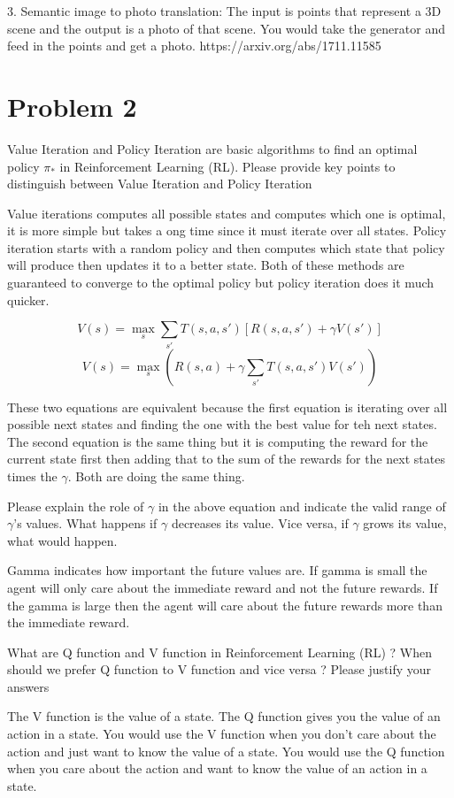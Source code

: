 \documentclass[12pt]{article}
\begin{document}
3. Semantic image to photo translation: The input is points that represent a 3D scene and the output is a photo of that scene. You would take the generator and feed in the points and get a photo. https://arxiv.org/abs/1711.11585

\section*{Problem 2}

Value Iteration and Policy Iteration are basic algorithms to find an optimal policy $\pi_{*}$ in Reinforcement Learning (RL). Please provide key points to distinguish between Value Iteration and Policy Iteration

Value iterations computes all possible states and computes which one is optimal, it is more simple but takes a ong time since it must iterate over all states. Policy iteration starts with a random policy and then computes which state that policy will produce then updates it to a better state. Both of these methods are guaranteed to converge to the optimal policy but policy iteration does it much quicker.


$$ V(s) = \max_{s} \sum_{s'} T(s,a,s') \left[ R(s,a,s') + \gamma V(s') \right] $$
$$ V(s) = \max_{s} (R(s,a) + \gamma \sum_{s'} T(s,a,s') V(s')) $$

These two equations are equivalent because the first equation is iterating over all possible next states and finding the one with the best value for teh next states. The second equation is the same thing but it is computing the reward for the current state first then adding that to the sum of the rewards for the next states times the $\gamma$. Both are doing the same thing.


Please explain the role of $\gamma$ in the above equation and indicate the valid range of $\gamma$'s values.
What happens if $\gamma$ decreases its value. Vice versa, if $\gamma$ grows its value, what would happen.

Gamma indicates how important the future values are. If gamma is small the agent will only care about the immediate reward and not the future rewards.
If the gamma is large then the agent will care about the future rewards more than the immediate reward.


What are Q function and V function in Reinforcement Learning (RL) ? When should we prefer Q function to V function and vice versa ? Please justify your answers

The V function is the value of a state. The Q function gives you the value of an action in a state. You would use the V function when you don't care about the action and just want to know the value of a state. You would use the Q function when you care about the action and want to know the value of an action in a state.
\end{document}

